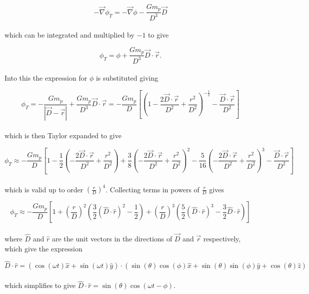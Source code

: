 \documentclass[11pt]{amsart}
\begin{document}
\begin{equation}
- \vec{\nabla} \phi_{T} = - \vec{\nabla} \phi - \frac{G m_{p}}{D^3} \vec{D}
\end{equation}
\\
which can be integrated and multiplied by $-1$ to give

\begin{equation}
\phi_{T} =  \phi + \frac{G m_{p}}{D^3} \vec{D} \cdot \vec{r}.
\end{equation}
\\

Into this the expression for $\phi$ is substituted giving

\begin{equation}
\phi_{T} = - \frac{G m_{p}}{|\vec{D} - \vec{r}|} + \frac{G m_{p}}{D^3} \vec{D} \cdot \vec{r}
= - \frac{G m_{p}}{D} \left[ \left( 1 - \frac{2 \vec{D} \cdot \vec{r}}{D^{2}} + \frac{r^{2}}{D^{2}}\right)^{-\frac{1}{2}} - \frac{\vec{D} \cdot \vec{r}}{D^{2}} \right]
\end{equation}
\\
which is then Taylor expanded to give

\begin{equation}
\phi_{T} \approx - \frac{G m_{p}}{D} \left[ 1 - \frac{1}{2} \left(  - \frac{2 \vec{D} \cdot \vec{r}}{D^{2}} + \frac{r^{2}}{D^{2}}\right)
+ \frac{3}{8} \left(  - \frac{2 \vec{D} \cdot \vec{r}}{D^{2}} + \frac{r^{2}}{D^{2}}\right)^{2} 
- \frac{5}{16} \left(  - \frac{2 \vec{D} \cdot \vec{r}}{D^{2}} + \frac{r^{2}}{D^{2}}\right)^{3}
- \frac{\vec{D} \cdot \vec{r}}{D^{2}} \right]
\end{equation}
\\
which is valid up to order $\left( \frac{r}{D} \right)^{4}$.  Collecting terms in powers of $\frac{r}{D}$ gives

\begin{equation}
\phi_{T} \approx - \frac{G m_{p}}{D} \left[
1
+ \left( \frac{r}{D} \right)^{2} \left( \frac{3}{2} (\hat{D} \cdot \hat{r})^{2} - \frac{1}{2} \right)
+ \left( \frac{r}{D} \right)^{3} \left( \frac{5}{2} (\hat{D} \cdot \hat{r})^{3} - \frac{3}{2} \hat{D} \cdot \hat{r} \right)
\right]
\end{equation}
\\
where $\hat{D}$ and $\hat{r}$ are the unit vectors in the directions of $\vec{D}$ and $\vec{r}$ respectively, which give the expression

\begin{equation}
\hat{D} \cdot \hat{r} = (\cos (\omega t) \hat{x} + \sin (\omega t) \hat{y}) \cdot (\sin(\theta)\cos(\phi) \hat{x} + \sin(\theta)\sin(\phi) \hat{y} + \cos(\theta) \hat{z})
\end{equation}
\\
which simplifies to give $\hat{D} \cdot \hat{r} = \sin(\theta) \cos(\omega t - \phi)$.
\end{document}
